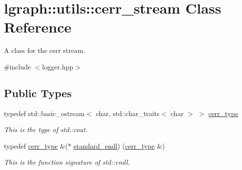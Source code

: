 \hypertarget{classlgraph_1_1utils_1_1cerr__stream}{}\section{lgraph\+:\+:utils\+:\+:cerr\+\_\+stream Class Reference}
\label{classlgraph_1_1utils_1_1cerr__stream}


A class for the cerr stream.  




{\ttfamily \#include $<$logger.\+hpp$>$}

\subsection*{Public Types}
\begin{DoxyCompactItemize}
\item 
\mbox{\label{classlgraph_1_1utils_1_1cerr__stream_a60b0847503d146249b71e70473740f57}} 
typedef std\+::basic\+\_\+ostream$<$ char, std\+::char\+\_\+traits$<$ char $>$ $>$ \hyperlink{classlgraph_1_1utils_1_1cerr__stream_a60b0847503d146249b71e70473740f57}{cerr\+\_\+type}
\begin{DoxyCompactList}\small\item\em This is the type of std\+::cout. \end{DoxyCompactList}\item 
\mbox{\label{classlgraph_1_1utils_1_1cerr__stream_a8b7e7603a4e656bd2d9196ae0f530c7b}} 
typedef \hyperlink{classlgraph_1_1utils_1_1cerr__stream_a60b0847503d146249b71e70473740f57}{cerr\+\_\+type} \&($\ast$ \hyperlink{classlgraph_1_1utils_1_1cerr__stream_a8b7e7603a4e656bd2d9196ae0f530c7b}{standard\+\_\+endl}) (\hyperlink{classlgraph_1_1utils_1_1cerr__stream_a60b0847503d146249b71e70473740f57}{cerr\+\_\+type} \&)
\begin{DoxyCompactList}\small\item\em This is the function signature of std\+::endl. \end{DoxyCompactList}\end{DoxyCompactItemize}
